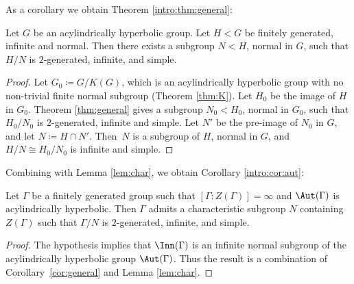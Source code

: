 As a corollary we obtain Theorem \ref{intro:thm:general}:

\begin{corollary}
\label{cor:general}
Let $G$ be an acylindrically hyperbolic group. Let $H < G$ be finitely generated, infinite and normal. Then there exists a subgroup $N < H$, normal in $G$, such that $H/N$ is $2$-generated, infinite, and simple.
\end{corollary}

\begin{proof}
Let $G_0 \coloneqq G/K(G)$, which is an acylindrically hyperbolic group with no non-trivial finite normal subgroup (Theorem \ref{thm:K}).
Let $H_0$ be the image of $H$ in $G_0$.
Theorem \ref{thm:general} gives a subgroup $N_0 < H_0$, normal in $G_0$, such that $H_0 / N_0$ is $2$-generated, infinite and simple.
Let $N'$ be the pre-image of $N_0$ in $G$, and let $N \coloneqq H \cap N'$.
Then~$N$ is a subgroup of $H$, normal in $G$, and $H/N \cong H_0 / N_0$ is infinite and simple.
\end{proof}

Combining with Lemma \ref{lem:char}, we obtain Corollary \ref{intro:cor:aut}:

\begin{corollary}
\label{cor:aut}
Let $\Gamma$ be a finitely generated group such that $[\Gamma : Z(\Gamma)] = \infty$ and $\Aut(\Gamma)$ is acylindrically hyperbolic.
Then $\Gamma$ admits a characteristic subgroup $N$ containing $Z(\Gamma)$ such that $\Gamma / N$ is $2$-generated, infinite, and simple.
\end{corollary}

\begin{proof}
The hypothesis implies that $\Inn(\Gamma)$ is an infinite normal subgroup of the acylindrically hyperbolic group $\Aut(\Gamma)$. Thus the result is a combination of Corollary~\ref{cor:general} and Lemma \ref{lem:char}.
\end{proof}

